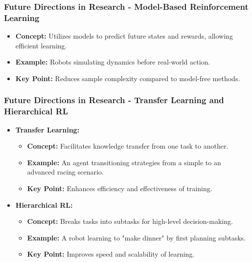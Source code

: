 \documentclass{beamer}
\begin{document}
\begin{frame}[fragile]
    \frametitle{Future Directions in Research - Model-Based Reinforcement Learning}
    \begin{itemize}
        \item \textbf{Concept:} Utilizes models to predict future states and rewards, allowing efficient learning.
        \item \textbf{Example:} Robots simulating dynamics before real-world action.
        \item \textbf{Key Point:} Reduces sample complexity compared to model-free methods.
    \end{itemize}
\end{frame}

\begin{frame}[fragile]
    \frametitle{Future Directions in Research - Transfer Learning and Hierarchical RL}
    \begin{itemize}
        \item \textbf{Transfer Learning:}
            \begin{itemize}
                \item \textbf{Concept:} Facilitates knowledge transfer from one task to another.
                \item \textbf{Example:} An agent transitioning strategies from a simple to an advanced racing scenario.
                \item \textbf{Key Point:} Enhances efficiency and effectiveness of training.
            \end{itemize}
        \item \textbf{Hierarchical RL:}
            \begin{itemize}
                \item \textbf{Concept:} Breaks tasks into subtasks for high-level decision-making.
                \item \textbf{Example:} A robot learning to "make dinner" by first planning subtasks.
                \item \textbf{Key Point:} Improves speed and scalability of learning.
            \end{itemize}
    \end{itemize}
\end{frame}
\end{document}

